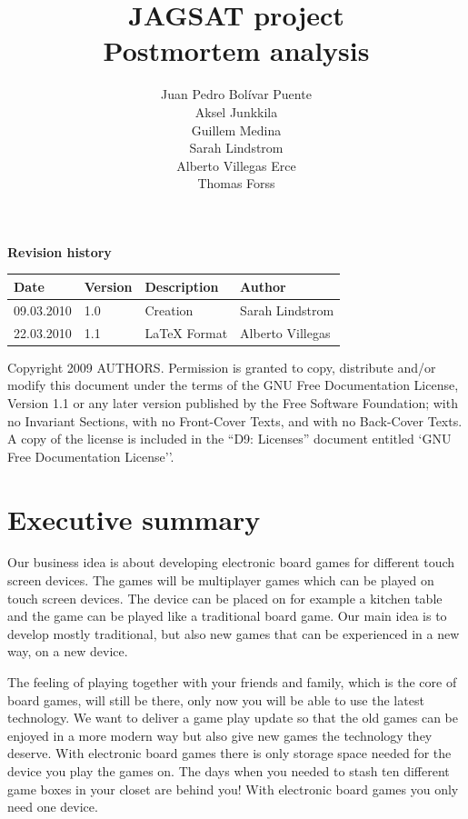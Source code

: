 \documentclass[12pt,a4paper]{article}
\title{\large JAGSAT project\\\huge Postmortem analysis}
\author{
  Juan Pedro Bolívar Puente\\ 
  Aksel Junkkila\\
  Guillem Medina\\ 
  Sarah Lindstrom\\ 
  Alberto Villegas Erce\\ 
  Thomas Forss
}
\begin{document}
\maketitle

\begin{center}
\textbf {Revision history}

\begin{tabular}{ l | l | l | l }
Date			&Version	&Description		&Author\\\hline\hline
09.03.2010	&1.0		&Creation 		&Sarah Lindstrom\\
22.03.2010	&1.1		&LaTeX Format	&Alberto Villegas
\end{tabular}
\label{tab:rev}
\end{center}

\vfill
Copyright 2009 AUTHORS.
Permission is granted to copy, distribute and/or modify this document under the terms of the GNU Free Documentation License, Version 1.1 or any later version published by the Free Software Foundation;  with no Invariant Sections, with no Front-Cover Texts, and with no Back-Cover Texts. A copy of the license is included in the ``D9: Licenses''  document entitled `GNU Free Documentation License''.

\pagebreak
\tableofcontents
\pagebreak

\section{Executive summary}
Our business idea is about developing electronic board games for different touch screen devices. The games will be multiplayer games which can be played on touch screen devices. The device can be placed on for example a kitchen table and the game can be played like a traditional board game. Our main idea is to develop mostly traditional, but also new games that can be experienced in a new way, on a new device.

The feeling of playing together with your friends and family, which is the core of board games, will still be there, only now you will be able to use the latest technology. We want to deliver a game play update so that the old games can be enjoyed in a more modern way but also give new games the technology they deserve. With electronic board games there is only storage space needed for the device you play the games on. The days when you needed to stash ten different game boxes in your closet are behind you! With electronic board games you only need one device.
\end{document}
